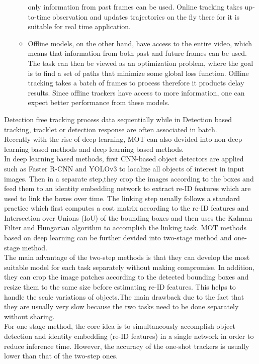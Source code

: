 \begin{itemize}
\begin{itemize}
                only information from past frames can be used. Online tracking takes up-to-time observation and updates trajectories on the fly there for it is suitable for real time application.
                \item Offline models, on the other hand, have access to the entire video, which means that information from both past and future frames can be used. The task can then be viewed as an 
                optimization problem, where the goal is to find a set of paths that minimize some global loss  function. Offline tracking takes a batch of frames to process therefore it products delay results. 
                Since offline trackers have access to more information, one can expect better performance from these models. 
            \end{itemize}
    \end{itemize}
    Detection free tracking process data sequentially while in Detection based tracking, tracklet or detection response are often associated in batch. \\ 
    \vspace{3mm}
    Recently with the rise of deep learning, MOT can also devided into non-deep learning based methods and deep learning based methods. \\ 
    \vspace{3mm}
    In deep learning based methods, first CNN-based object detectors are applied such as Faster R-CNN and YOLOv3 to localize all objects of interest in input images. Then in a separate step,they crop the images 
    according to the boxes and feed them to an identity embedding network to extract re-ID features which are used to link the boxes over time. The linking step usually follows a standard practice which first 
    computes a cost matrix according to the re-ID features and Intersection over Unions (IoU) of the bounding boxes and then uses the Kalman Filter and Hungarian algorithm to accomplish the linking task. 
    MOT methods based on deep learning can be further devided into two-stage method and one-stage method. \\ 
    \vspace{3mm}
    The main advantage of the two-step methods is that they can develop the most suitable model for each task separately without making compromise. In addition, they can crop the image patches according to the 
    detected bounding boxes and resize them to the same size before estimating re-ID features. This helps to handle the scale variations of objects.The main drawback due to the fact that they are usually very 
    slow because the two tasks need to be done separately without sharing. \\ 
    \vspace{3mm}
    For one stage method, the core idea is to simultaneously accomplish object detection and identity embedding (re-ID features) in a single network in order to reduce inference time. However, the accuracy of the 
    one-shot trackers is usually lower than that of the two-step ones.

